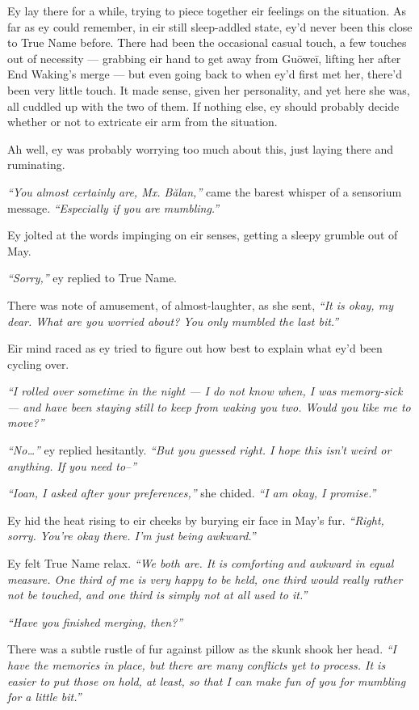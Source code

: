Ey lay there for a while, trying to piece together eir feelings on the situation. As far as ey could remember, in eir still sleep-addled state, ey'd never been this close to True Name before. There had been the occasional casual touch, a few touches out of necessity — grabbing eir hand to get away from Guōweī, lifting her after End Waking's merge — but even going back to when ey'd first met her, there'd been very little touch. It made sense, given her personality, and yet here she was, all cuddled up with the two of them. If nothing else, ey should probably decide whether or not to extricate eir arm from the situation.

Ah well, ey was probably worrying too much about this, just laying there and ruminating.

\emph{``You almost certainly are, Mx. Bălan,''} came the barest whisper of a sensorium message. \emph{``Especially if you are mumbling.''}

Ey jolted at the words impinging on eir senses, getting a sleepy grumble out of May.

\emph{``Sorry,''} ey replied to True Name.

There was note of amusement, of almost-laughter, as she sent, \emph{``It is okay, my dear. What are you worried about? You only mumbled the last bit.''}

Eir mind raced as ey tried to figure out how best to explain what ey'd been cycling over.

\emph{``I rolled over sometime in the night — I do not know when, I was memory-sick — and have been staying still to keep from waking you two. Would you like me to move?''}

\emph{``No\ldots{}''} ey replied hesitantly. \emph{``But you guessed right. I hope this isn't weird or anything. If you need to--''}

\emph{``Ioan, I asked after your preferences,''} she chided. \emph{``I am okay, I promise.''}

Ey hid the heat rising to eir cheeks by burying eir face in May's fur. \emph{``Right, sorry. You're okay there. I'm just being awkward.''}

Ey felt True Name relax. \emph{``We both are. It is comforting and awkward in equal measure. One third of me is very happy to be held, one third would really rather not be touched, and one third is simply not at all used to it.''}

\emph{``Have you finished merging, then?''}

There was a subtle rustle of fur against pillow as the skunk shook her head. \emph{``I have the memories in place, but there are many conflicts yet to process. It is easier to put those on hold, at least, so that I can make fun of you for mumbling for a little bit.''}

